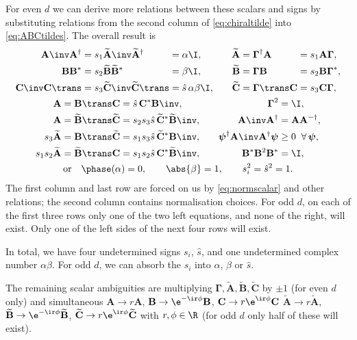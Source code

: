 \documentclass[11pt]{article}
\newcommand{\invd}{^{-\dag}}
\newcommand{\Gammab}{\boldsymbol{\Gamma}}
\newcommand{\A}{\mathbf{A}}
\newcommand{\B}{\mathbf{B}}
\renewcommand{\C}{\mathbf{C}}
\newcommand{\At}{\widetilde{\mathbf{A}}}
\newcommand{\Bt}{\widetilde{\mathbf{B}}}
\newcommand{\Ct}{\widetilde{\mathbf{C}}}
\newcommand{\psib}{\boldsymbol{\psi}}
\begin{document}
For even $d$ we can derive more relations between these scalars and signs by substituting relations from the second column of \cref{eq:chiraltilde} into \cref{eq:ABCtildes}.
The overall result is
%
\begin{equation}\label{eq:constnorm}
\begin{gathered}
\begin{alignedat}{4}
  \A\inv \A^\dag &= s_1 \At\inv \At^\dag &
        &= \alpha \I, &
    \At &= \Gammab^\dag \A &
        &= s_1 \A \Gammab,
  \\
  \B \B^\ast &= s_2 \Bt \Bt^\ast &
        &= \beta \I, &
    \Bt &= \Gammab \B &
        &= s_2 \B \Gammab^\ast,
  \\
  \C\inv \C\trans &= s_3 \Ct\inv \Ct\trans &
        &= \hat{s}\, \alpha \beta \I, &\qquad
    \Ct &= \Gammab\trans \C &
        &= s_3 \C \Gammab,
  \\
\end{alignedat}
\\
\begin{alignedat}{3}
  \A &= \B\trans \C &
        &= \hat{s}\, \C^\ast \B\inv, &\qquad
    \Gammab^2 &= \I,
  \\
  \A &= \Bt\trans \Ct &
        &= s_2 s_3 \hat{s}\, \Ct^\ast \Bt\inv, &\qquad
    \A\inv \A^\dag &= \A \A\invd,
  \\
  s_3 \At &= \B\trans \Ct &
        &= s_1 s_3 \hat{s}\, \Ct^\ast \B\inv, &\qquad
    \psib^\dag \A\inv \A^\dag \psib &\geq 0 \;\; \forall \, \psib,
  \\
  s_1 s_2 \At &= \Bt\trans \C &
        &= s_1 s_2 \hat{s}\, \C^\ast \Bt\inv, &
    \B^\ast \B^2 \B^\ast &= \I,
\end{alignedat}
\\
  \text{or}\quad
  \phase(\alpha) = 0, \qquad
  \abs{\beta} = 1, \qquad
  s_i^2 = \hat{s}^2 = 1.
\end{gathered}
\end{equation}
%
The first column and last row are forced on us by \cref{eq:normscalar} and other relations; the second column contains normalisation choices.
For odd $d$, on each of the first three rows only one of the two left equations, and none of the right, will exist.
Only one of the left sides of the next four rows will exist.

In total, we have four undetermined signs $s_i$, $\hat{s}$, and one undetermined complex number $\alpha \beta$.
For odd $d$, we can absorb the $s_i$ into $\alpha$, $\beta$ or $\hat{s}$.

The remaining scalar ambiguities are multiplying $\Gammab,\At,\Bt,\Ct$ by $\pm1$ (for even $d$ only)
and simultaneous \( \A \rightarrow r \A \),
\( \B \rightarrow \e^{-\ir\phi} \B \), \( \C \rightarrow r\e^{\ir\phi} \C \)
\( \At \rightarrow r \At \), \( \Bt \rightarrow \e^{-\ir\phi} \Bt \),
\( \Ct \rightarrow r\e^{\ir\phi} \Ct \) with \( r, \phi \in \R \) (for odd $d$ only half of these will exist).
\end{document}
